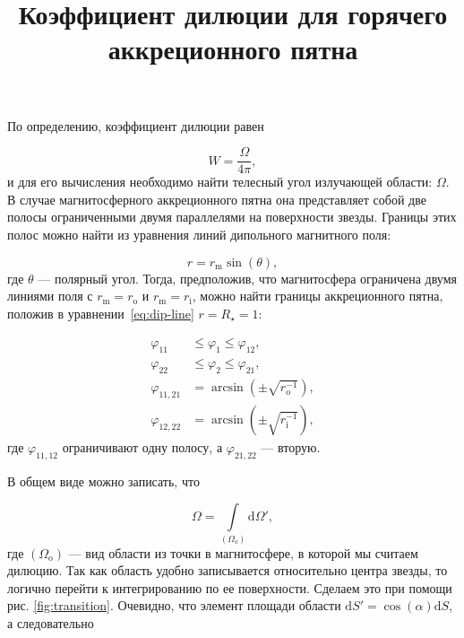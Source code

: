 \documentclass[12pt]{article}
\begin{document}
\title{Коэффициент дилюции для горячего аккреционного пятна}
\date{}
\maketitle

По определению, коэффициент дилюции равен 

\begin{equation}\label{eq:dilut-def}
W = \frac{\Omega}{4\pi},
\end{equation}
и для его вычисления необходимо найти телесный угол излучающей области: $\Omega$. В случае магнитосферного аккреционного пятна она представляет собой две полосы ограниченными двумя параллелями на поверхности звезды. Границы этих полос можно найти из уравнения линий дипольного магнитного поля:

\begin{equation}\label{eq:dip-line}
r = r_\text{m} \sin(\theta),
\end{equation}   
где $\theta$ --- полярный угол. Тогда, предположив, что магнитосфера ограничена двумя линиями поля с $r_\text{m} = r_\text{o}$ и $r_\text{m} = r_\text{i}$, можно найти границы аккреционного пятна, положив в уравнении~\eqref{eq:dip-line} $r = R_\star = 1$:

\begin{equation}\label{eq:star-field}
\begin{aligned}
\varphi_{11} &\le \varphi_1 \le \varphi_{12}, \\
\varphi_{22} &\le \varphi_2 \le \varphi_{21}, \\
\varphi_{11,21}& = \arcsin(\pm\sqrt{r_\text{o}^{-1}}), \\
\varphi_{12,22}& = \arcsin(\pm\sqrt{r_\text{i}^{-1}}), 
\end{aligned}
\end{equation}
где $\varphi_{11,12}$ ограничивают одну полосу, а $\varphi_{21,22}$ --- вторую. 

В общем виде можно записать, что

\begin{equation}\label{eq:omega-def}
\Omega = \int\limits_{(\Omega_\text{o})} \text{d}\Omega',
\end{equation}
где $(\Omega_\text{o})$ --- вид области из точки в магнитосфере, в которой мы считаем дилюцию. Так как область удобно записывается относительно центра звезды, то логично перейти к интегрированию по ее поверхности. Сделаем это при помощи рис. \ref{fig:transition}. Очевидно, что элемент площади области $\text{d}S' = \cos(\alpha)\text{d}S$, а следовательно
\end{document}
